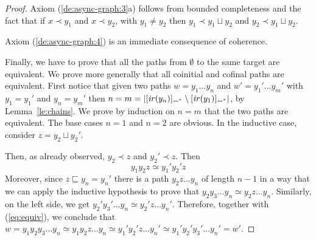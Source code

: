 \begin{proof}
  Axiom (\ref{de:async-graph:3}a) follows from bounded completeness
  and the fact that if $x \prec y_1$ and $x \prec y_2$, with
  $y_1 \neq y_2$ then $y_1 \prec y_1 \sqcup y_2$ and
  $y_2 \prec y_1 \sqcup y_2$.

  Axiom (\ref{de:async-graph:4}) is an immediate
  consequence of coherence.

  Finally, we have to prove that all the paths from $\emptyset$ to the
  same target are equivalent. We prove more generally that all
  coinitial and cofinal paths are equivalent. First 
  notice that given
  two paths $w = y_1 \ldots y_n$ and $w' = y_1' \ldots y_m'$ with
  $y_1=y_1'$ and $y_n=y_m'$ then  $n=m=|[{\mathop{\mathit{ir}({y_n})}}]_{\scriptscriptstyle {\leftrightarrow^*}} \setminus [{\mathop{\mathit{ir}({y_1})}}]_{\scriptscriptstyle {\leftrightarrow^*}}|$, by Lemma~\ref{le:chains}. We prove
  by induction on $n=m$ that the two paths are equivalent. The base
  cases $n=1$ and $n=2$ are obvious.
  In the inductive case, consider
  $z = y_2 \sqcup y_2'$.
  \begin{center}
  \end{center}
  
  Then, as already observed, $y_2 \prec z$ and
  $y_2' \prec z$. Then
  \begin{equation}
    \label{eq:equiv}
    y_1 y_2 z \simeq y_1' y_2' z
  \end{equation}
  Moreover, since $z \sqsubseteq y_n=y_n'$ there is a path
  $y_2 z \ldots y_n$ of length $n-1$ in a way that we can apply the
  inductive hypothesis to prove that
  $y_2 y_3 \ldots y_n \simeq y_2 z \ldots y_n$.  Similarly, on the
  left side, we get $y_2' y_3' \ldots y_n \simeq y_2' z \ldots
  y_n'$. Therefore, together with (\ref{eq:equiv}), we conclude that
  $w= y_1 y_2 y_3 \ldots y_n \simeq y_1 y_2 z \ldots y_n \simeq y_1'
  y_2' z \ldots y_n' \simeq y_1' y_2' y_3' \ldots y_n' = w'$.


\end{proof}
